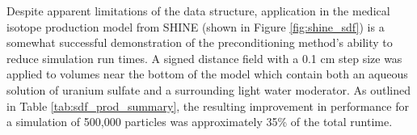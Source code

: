 \begin{table}[H]
  \small
  \caption[A summary of geometric query calls in DAG-MCNP.]{A summary of the
    relative number of calls to the various Monte Carlo geometric queries for
    several DAGMC production models. \protect\footnotemark}
  \label{tab:geom_query_ratios}
\end{table}  


Despite apparent limitations of the data structure, application in the medical
isotope production model from SHINE (shown in Figure \ref{fig:shine_sdf}) is a
somewhat successful demonstration of the preconditioning method's ability to
reduce simulation run times. A signed distance field with a 0.1 cm step size was
applied to volumes near the bottom of the model which contain both an aqueous
solution of uranium sulfate and a surrounding light water moderator. As outlined
in Table \ref{tab:sdf_prod_summary}, the resulting improvement in performance
for a simulation of 500,000 particles was approximately 35\% of the total
runtime.

